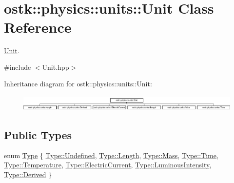 \hypertarget{classostk_1_1physics_1_1units_1_1_unit}{}\section{ostk\+:\+:physics\+:\+:units\+:\+:Unit Class Reference}
\label{classostk_1_1physics_1_1units_1_1_unit}


\hyperlink{classostk_1_1physics_1_1units_1_1_unit}{Unit}.  




{\ttfamily \#include $<$Unit.\+hpp$>$}

Inheritance diagram for ostk\+:\+:physics\+:\+:units\+:\+:Unit\+:\begin{figure}[H]
\begin{center}
\leavevmode
\includegraphics[height=0.868217cm]{classostk_1_1physics_1_1units_1_1_unit}
\end{center}
\end{figure}
\subsection*{Public Types}
\begin{DoxyCompactItemize}
\item 
enum \hyperlink{classostk_1_1physics_1_1units_1_1_unit_a113924e2dd880bd0e95d4ee9646ea4ca}{Type} \{ \newline
\hyperlink{classostk_1_1physics_1_1units_1_1_unit_a113924e2dd880bd0e95d4ee9646ea4caaec0fc0100c4fc1ce4eea230c3dc10360}{Type\+::\+Undefined}, 
\hyperlink{classostk_1_1physics_1_1units_1_1_unit_a113924e2dd880bd0e95d4ee9646ea4caaba2a9c6c8c77e03f83ef8bf543612275}{Type\+::\+Length}, 
\hyperlink{classostk_1_1physics_1_1units_1_1_unit_a113924e2dd880bd0e95d4ee9646ea4caaff2864d6f652ee0ac254814f1ae4f4a8}{Type\+::\+Mass}, 
\hyperlink{classostk_1_1physics_1_1units_1_1_unit_a113924e2dd880bd0e95d4ee9646ea4caaa76d4ef5f3f6a672bbfab2865563e530}{Type\+::\+Time}, 
\newline
\hyperlink{classostk_1_1physics_1_1units_1_1_unit_a113924e2dd880bd0e95d4ee9646ea4caaee7a8e262285ed49ea1b4e4ae11525bd}{Type\+::\+Temperature}, 
\hyperlink{classostk_1_1physics_1_1units_1_1_unit_a113924e2dd880bd0e95d4ee9646ea4caa9a60fd92ac6161bffa549ef2cd17f05e}{Type\+::\+Electric\+Current}, 
\hyperlink{classostk_1_1physics_1_1units_1_1_unit_a113924e2dd880bd0e95d4ee9646ea4caae91a9eb4f5dcc51ea18e180ea981d6ae}{Type\+::\+Luminous\+Intensity}, 
\hyperlink{classostk_1_1physics_1_1units_1_1_unit_a113924e2dd880bd0e95d4ee9646ea4caa0e77a10e9579997fa646fbda4118e108}{Type\+::\+Derived}
 \}
\end{DoxyCompactItemize}
